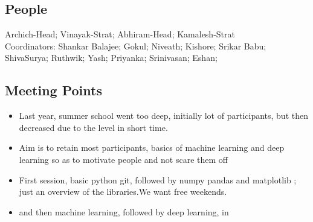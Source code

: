 \documentclass[11pt]{scrartcl}
\begin{document}
\subsection{People}
Archich-Head;
Vinayak-Strat;
Abhiram-Head;
Kamalesh-Strat\\
Coordinators:
Shankar Balajee;
Gokul;
Niveath;
Kishore;
Srikar Babu;
ShivaSurya;
Ruthwik;
Yash;
Priyanka;
Srinivasan;
Eshan;
\subsection{Meeting Points}
\begin{itemize}
    \item Last year, summer school went too deep, initially lot of participants, but then decreased due to the level in short time.
    \item Aim is to retain most participants, basics of machine learning and deep learning so as to motivate people and not scare them off
    \item First session, basic python git, followed by numpy pandas and matplotlib ; just an overview of the libraries.We want free weekends.
    \item and then machine learning, followed by deep learning, in
\end{itemize}
\end{document}
